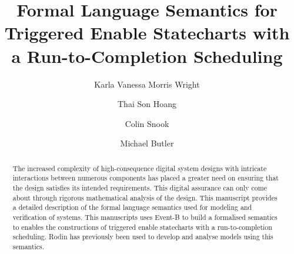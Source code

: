 \documentclass[runningheads]{llncs}
\begin{document}
%
\title{Formal Language Semantics for Triggered Enable Statecharts with a Run-to-Completion Scheduling}
%
%
\author{
Karla Vanessa Morris Wright \and
Thai Son Hoang  \and
Colin Snook \and
Michael Butler
}
%
%
%
%
\maketitle              %
%
\begin{abstract}
The increased complexity of high-consequence digital system designs with intricate interactions between numerous components has placed a greater need on ensuring that the design satisfies its intended requirements. This digital assurance can only come about through rigorous mathematical analysis of the design. This manuscript provides a detailed description of the formal language semantics used for modeling and verification of systems. This manuscripts uses Event-B to build a formalised semantics to enables the constructions of triggered enable statecharts with a run-to-completion scheduling. Rodin has previously been used to develop and analyse models using this semantics. 

\end{abstract}
%
%
%
\end{document}
